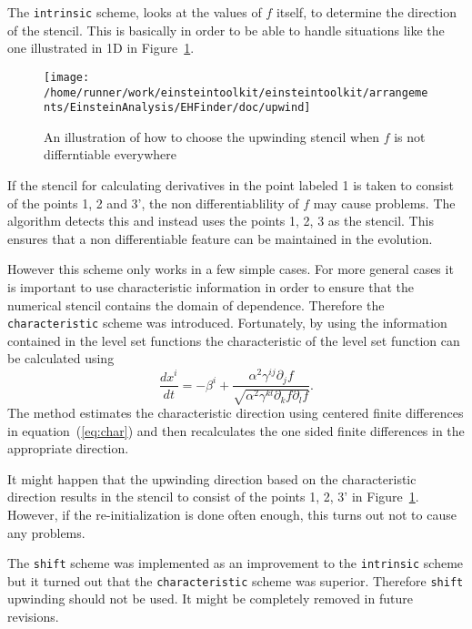 The {\tt intrinsic} scheme, looks at the values of $f$ itself, to determine
the direction of the stencil. This is basically in order to be able to handle
situations like the one illustrated in 1D in
Figure~\ref{AEIThorns_EHFinder_upwindfig}.
\begin{figure}[ht]
  \begin{center}
    \texttt{[image: /home/runner/work/einsteintoolkit/einsteintoolkit/arrangements/EinsteinAnalysis/EHFinder/doc/upwind]}
  \end{center}
  \caption{An illustration of how to choose the upwinding stencil when $f$
           is not differntiable everywhere}
  \label{AEIThorns_EHFinder_upwindfig}
\end{figure}
If the stencil for calculating derivatives in the point labeled 1 is taken
to consist of the points 1, 2 and 3', the non differentiablility of $f$ may
cause problems. The algorithm detects this and instead uses the points 1, 2, 3
as the stencil. This ensures that a non differentiable feature can be
maintained in the evolution.

However this scheme only works in a few simple cases. For more general cases
it is important to use characteristic information in order to ensure that
the numerical stencil contains the domain of dependence. Therefore the
{\tt characteristic} scheme was introduced. Fortunately, by using the
information contained in the level set functions the characteristic of
the level set function can be calculated using
\begin{equation}
\frac{dx^{i}}{dt}=-\beta^{i}+\frac{\alpha^{2}\gamma^{ij}\partial_{j}f}
{\sqrt{\alpha^{2}\gamma^{kl}\partial_{k}f\partial_{l}f}}. 
\label{eq:char}
\end{equation}
The method estimates the characteristic direction using centered finite
differences in equation~(\ref{eq:char}) and then recalculates the one
sided finite differences in the appropriate direction.

It might happen that the upwinding direction based on the characteristic
direction results in the stencil to consist of the points 1, 2, 3' in 
Figure~\ref{AEIThorns_EHFinder_upwindfig}. However, if the 
re-initialization is done often enough, this turns out not to cause
any problems.

The {\tt shift} scheme was implemented as an improvement to the {\tt intrinsic}
scheme but it turned out that the {\tt characteristic} scheme was superior.
Therefore {\tt shift} upwinding should not be used. It might be completely
removed in future revisions.


